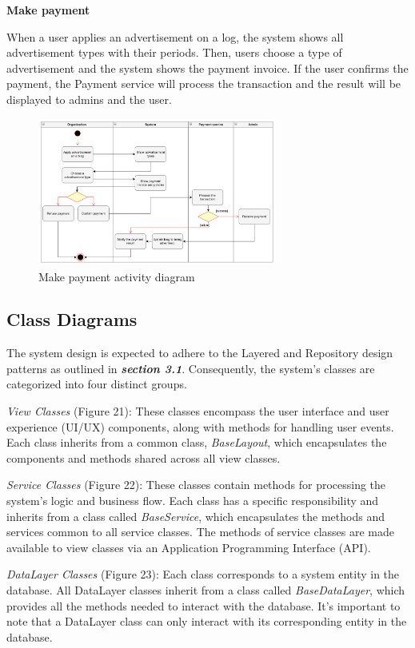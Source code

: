 \textbf{Make payment}

When a user applies an advertisement on a log, the system shows all advertisement types with their periods. Then, users choose a type of advertisement and the system shows the payment invoice. If the user confirms the payment, the Payment service will process the transaction and the result will be displayed to admins and the user.

\begin {figure}[H]
\centering
\includegraphics[width=0.7\textwidth]{Figures/payment.png}
\caption{Make payment activity diagram}
\label{fig:make-payment}
\end{figure}

\subsection{Class Diagrams}

The system design is expected to adhere to the Layered and Repository
design patterns as outlined in \emph{\textbf{section 3.1}}.
Consequently, the system's classes are categorized into four distinct
groups.

\emph{View Classes} (Figure 21): These classes encompass the user
interface and user experience (UI/UX) components, along with methods for
handling user events. Each class inherits from a common class,
\emph{BaseLayout}, which encapsulates the components and methods shared
across all view classes.

\emph{Service Classes} (Figure 22): These classes contain methods for
processing the system's logic and business flow. Each class has a
specific responsibility and inherits from a class called
\emph{BaseService}, which encapsulates the methods and services common
to all service classes. The methods of service classes are made
available to view classes via an Application Programming Interface
(API).

\emph{DataLayer Classes} (Figure 23): Each class corresponds to a system
entity in the database. All DataLayer classes inherit from a class
called \emph{BaseDataLayer}, which provides all the methods needed to
interact with the database. It's important to note that a DataLayer
class can only interact with its corresponding entity in the database.

